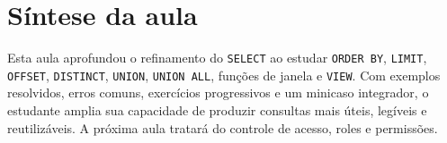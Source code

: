 \section{Síntese da aula}

Esta aula aprofundou o refinamento do \texttt{SELECT} ao estudar \texttt{ORDER BY}, \texttt{LIMIT}, \texttt{OFFSET}, \texttt{DISTINCT}, \texttt{UNION}, \texttt{UNION ALL}, funções de janela e \texttt{VIEW}. Com exemplos resolvidos, erros comuns, exercícios progressivos e um minicaso integrador, o estudante amplia sua capacidade de produzir consultas mais úteis, legíveis e reutilizáveis. A próxima aula tratará do controle de acesso, roles e permissões.